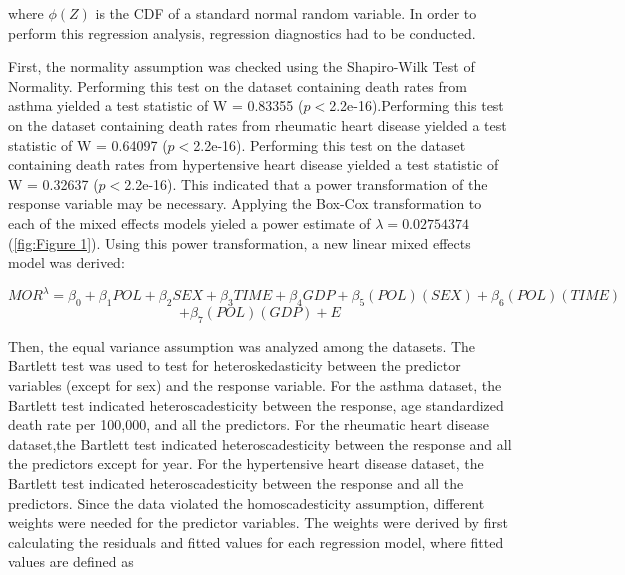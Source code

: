 \documentclass[12pt, letterpaper, twoside]{article}\usepackage[]{graphicx}\usepackage[]{xcolor}
\begin{document}
where \begin{math}\phi(Z)\end{math} is the CDF of a standard normal random
variable. In order to perform this regression analysis, regression diagnostics
had to be conducted.\par

First, the normality assumption was checked using the
Shapiro-Wilk Test of Normality. Performing this test on the dataset containing
death rates from asthma yielded a test statistic of W = 0.83355
(\begin{math}p<\end{math}2.2e-16).Performing this test on the dataset containing
death rates from rheumatic heart disease yielded a test statistic of W = 0.64097
(\begin{math}p<\end{math}2.2e-16). Performing this test on the dataset containing
death rates from hypertensive heart disease yielded a test statistic of
W = 0.32637 (\begin{math}p<\end{math}2.2e-16). This indicated that a power
transformation of the response variable may be necessary. Applying the Box-Cox
transformation to each of the mixed effects models yieled a power estimate of
\begin{math}\lambda=0.02754374\end{math} (\autoref{fig:Figure 1}). Using this
power transformation, a new linear mixed effects model was derived:

\[
  MOR^{\lambda} = \beta_{0} + \beta_{1}POL + \beta_{2}SEX + \beta_{3}TIME +\beta_{4}GDP
  + \beta_{5}(POL)(SEX) + \beta_{6}(POL)(TIME)
\]
\[
 + \beta_{7}(POL)(GDP) + E
\]

\par Then, the equal variance assumption was analyzed among the datasets. The
Bartlett test was used to test for heteroskedasticity between the predictor
variables (except for sex) and the response variable. For the asthma dataset,
the Bartlett test indicated heteroscadesticity between the response, age
standardized death rate per 100,000, and all the predictors. For the rheumatic
heart disease dataset,the Bartlett test indicated heteroscadesticity between the
response and all the predictors except for year. For the hypertensive heart
disease dataset, the Bartlett test indicated heteroscadesticity between the
response and all the predictors. Since the data violated the homoscadesticity
assumption, different weights were needed for the predictor variables. The weights
were derived by first calculating the residuals and fitted values for each regression
model, where fitted values are defined as
\end{document}
